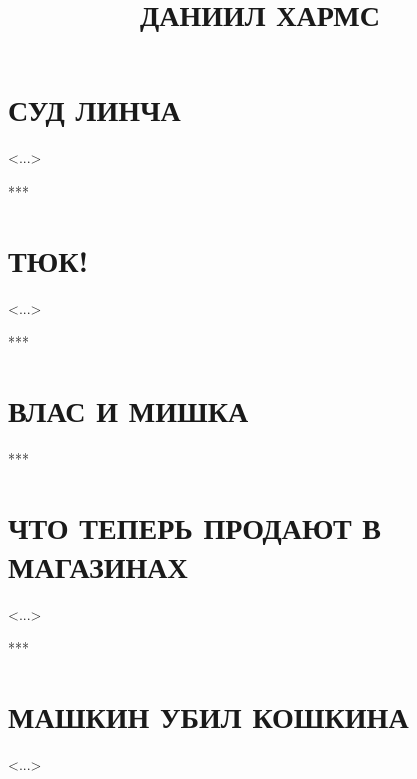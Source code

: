 \documentclass[12pt,a4paper]{article}
\title{ДАНИИЛ ХАРМС}
\author{}
\date{}
\begin{document}
\maketitle

\section*{\centering СУД ЛИНЧА}

\hfill <...>
\begin{center}
***
\end{center}

\section*{\centering ТЮК!}

\vspace{1em}
\hfill <...>
\begin{center}
***
\end{center}

\section*{\centering ВЛАС И МИШКА}
\begin{center}
\begin{minipage}{0.5\textwidth}

\end{minipage}
\end{center}
\begin{center}
***
\end{center}

\section*{\centering ЧТО ТЕПЕРЬ ПРОДАЮТ В МАГАЗИНАХ}


\hfill <...>
\begin{center}
***
\end{center}

\section*{\centering МАШКИН УБИЛ КОШКИНА}


\hfill <...>
\end{document}
